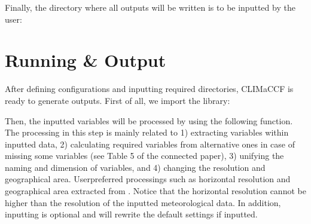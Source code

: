 \documentclass[a4paper,11pt,english]{sphinxmanual}
\begin{document}
\begin{sphinxVerbatim}[commandchars=\\\{\}]
 \PYG{p}{[}\PYG{p}{]}  
\end{sphinxVerbatim}

\sphinxAtStartPar
Finally, the directory where all outputs will be written is to be inputted by the user:

\begin{sphinxVerbatim}[commandchars=\\\{\}]
  
\end{sphinxVerbatim}


\section{Running \& Output}
\label{\detokenize{gStarted:running-output}}
\sphinxAtStartPar
After defining configurations and inputting required directories, CLIMaCCF is ready to generate outputs. First of all, we import the library:

\begin{sphinxVerbatim}[commandchars=\\\{\}]
 
   
\end{sphinxVerbatim}

\sphinxAtStartPar
Then, the inputted variables will be processed by using the following function. The processing in this step is mainly related to 1) extracting variables within inputted data, 2) calculating required variables from alternative ones in case of missing some variables (see Table 5 of the connected paper), 3) unifying the naming and dimension of variables, and 4) changing the resolution and geographical area.
User\sphinxhyphen{}preferred processings such as horizontal resolution and geographical area extracted from . Notice that the horizontal resolution cannot be higher than the resolution of the inputted meteorological data. In addition, inputting  is optional and will rewrite the default settings if inputted.
\end{document}
